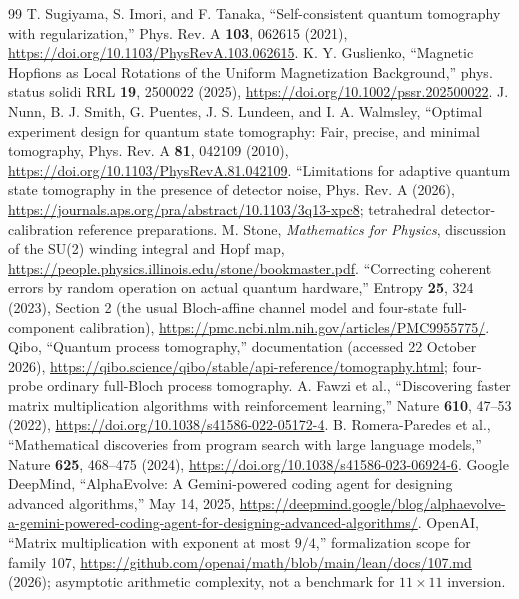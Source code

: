 \documentclass[aps,prd,onecolumn,notitlepage,11pt,superscriptaddress,longbibliography]{revtex4-2}
\begin{document}
\begin{thebibliography}{99}
 T. Sugiyama, S. Imori, and F. Tanaka, ``Self-consistent quantum tomography with regularization,'' Phys. Rev. A \textbf{103}, 062615 (2021), \url{https://doi.org/10.1103/PhysRevA.103.062615}.
 K. Y. Guslienko, ``Magnetic Hopfions as Local Rotations of the Uniform Magnetization Background,'' phys. status solidi RRL \textbf{19}, 2500022 (2025), \url{https://doi.org/10.1002/pssr.202500022}.
 J. Nunn, B. J. Smith, G. Puentes, J. S. Lundeen, and I. A. Walmsley, ``Optimal experiment design for quantum state tomography: Fair, precise, and minimal tomography, Phys. Rev. A \textbf{81}, 042109 (2010), \url{https://doi.org/10.1103/PhysRevA.81.042109}.
 ``Limitations for adaptive quantum state tomography in the presence of detector noise, Phys. Rev. A (2026), \url{https://journals.aps.org/pra/abstract/10.1103/3q13-xpc8}; tetrahedral detector-calibration reference preparations.
 M. Stone, \emph{Mathematics for Physics}, discussion of the SU(2) winding integral and Hopf map, \url{https://people.physics.illinois.edu/stone/bookmaster.pdf}.
 ``Correcting coherent errors by random operation on actual quantum hardware,'' Entropy \textbf{25}, 324 (2023), Section 2 (the usual Bloch-affine channel model and four-state full-component calibration), \url{https://pmc.ncbi.nlm.nih.gov/articles/PMC9955775/}.
 Qibo, ``Quantum process tomography,'' documentation (accessed 22 October 2026), \url{https://qibo.science/qibo/stable/api-reference/tomography.html}; four-probe ordinary full-Bloch process tomography.
 A. Fawzi et al., ``Discovering faster matrix multiplication algorithms with reinforcement learning,'' Nature \textbf{610}, 47--53 (2022), \url{https://doi.org/10.1038/s41586-022-05172-4}.
 B. Romera-Paredes et al., ``Mathematical discoveries from program search with large language models,'' Nature \textbf{625}, 468--475 (2024), \url{https://doi.org/10.1038/s41586-023-06924-6}.
 Google DeepMind, ``AlphaEvolve: A Gemini-powered coding agent for designing advanced algorithms,'' May 14, 2025, \url{https://deepmind.google/blog/alphaevolve-a-gemini-powered-coding-agent-for-designing-advanced-algorithms/}.
 OpenAI, ``Matrix multiplication with exponent at most $9/4$,'' formalization scope for family 107, \url{https://github.com/openai/math/blob/main/lean/docs/107.md} (2026); asymptotic arithmetic complexity, not a benchmark for $11\times11$ inversion.
\end{thebibliography}
\end{document}
